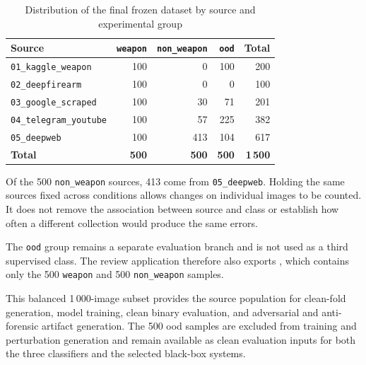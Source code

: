 \begin{table}[H]
\centering
\small
\renewcommand{\arraystretch}{1.15}
\setlength{\tabcolsep}{5pt}
\caption{Distribution of the final frozen dataset by source and experimental group}
\label{tab:implementation-final-source-distribution}
\begin{tabular}{@{}lrrrr@{}}
\toprule
\textbf{Source} &
\textbf{\texttt{weapon}} &
\textbf{\texttt{non\_weapon}} &
\textbf{\texttt{ood}} &
\textbf{Total} \\
\midrule

\texttt{01\_kaggle\_weapon}
& 100
& 0
& 100
& 200 \\

\texttt{02\_deepfirearm}
& 100
& 0
& 0
& 100 \\

\texttt{03\_google\_scraped}
& 100
& 30
& 71
& 201 \\

\texttt{04\_telegram\_youtube}
& 100
& 57
& 225
& 382 \\

\texttt{05\_deepweb}
& 100
& 413
& 104
& 617 \\

\midrule
\textbf{Total}
& \textbf{500}
& \textbf{500}
& \textbf{500}
& \textbf{1\,500} \\

\bottomrule
\end{tabular}
\end{table}

Of the 500 \texttt{non\_weapon} sources, 413 come from
\texttt{05\_deepweb}. Holding the same sources fixed across conditions allows
changes on individual images to be counted. It does not remove the association
between source and class or establish how often a different collection would
produce the same errors.

The \texttt{ood} group remains a separate evaluation branch and is not used as
a third supervised class. The review application therefore also exports
,
which contains only the 500 \texttt{weapon} and 500
\texttt{non\_weapon} samples.

This balanced 1\,000-image subset provides the source population for clean-fold
generation, model training, clean binary evaluation, and adversarial and
anti-forensic artifact generation. The 500 \gls{ood} samples are excluded from
training and perturbation generation and remain available as clean evaluation
inputs for both the three classifiers and the selected black-box systems.

